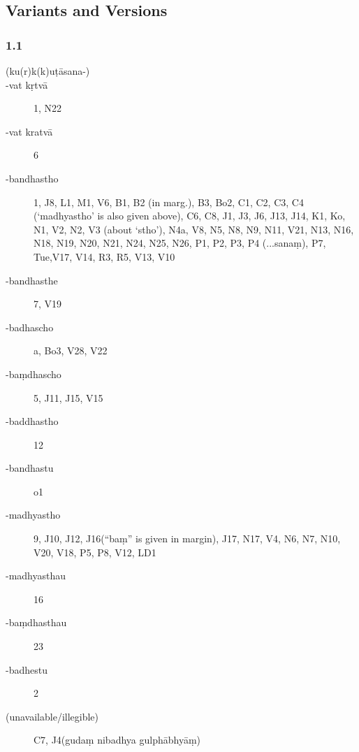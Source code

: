

\newcommand{\myfn}[1]{\footnote{\texteng{#1}}}
\setlength{\footmarkwidth}{1.3em}
\setlength{\footmarksep}{0em}
\setlength{\footparindent}{1.3em}
\usepackage{fnpos}
\makeFNbottom




\pagestyle{HPed} %
\begin{ekdosis}
  
  \chapter{Variants and Versions}

  \subsection*{1.1}
  

  \begin{marma}[hp01_001]
    
    \begin{description}
    \item[(ku(r)k(k)uṭāsana-)]{}
    \item[-vat kṛtvā]{1, N22}
    \item[-vat kratvā]{6}
    \item[-bandhastho]{1, J8, L1, M1, V6, B1, B2 (in marg.), B3, Bo2, C1, C2, C3, C4 (‘madhyastho’ is also given above), C6, C8, J1, J3, J6, J13, J14, K1, Ko, N1, V2, N2, V3 (about ‘stho’), N4a, V8, N5, N8, N9, N11, V21, N13, N16, N18, N19, N20, N21, N24, N25, N26, P1, P2, P3, P4 (...sanaṃ), P7, Tue,V17, V14, R3, R5, V13, V10}
    \item[-bandhasthe]{7, V19}
    \item[-badhascho]{a, Bo3, V28, V22}
    \item[-baṃdhascho]{5, J11, J15, V15}
    \item[-baddhastho]{12}
    \item[-bandhastu]{o1}
    \item[-madhyastho]{9, J10, J12, J16(“baṃ” is given in margin), J17, N17, V4, N6, N7, N10, V20, V18, P5, P8, V12, LD1}
    \item[-madhyasthau]{16}
    \item[-baṃdhasthau]{23}
    \item[-badhestu]{2}
    \item[(unavailable/illegible)]{C7, J4(gudaṃ nibadhya gulphābhyāṃ)}
    \end{description}
    
  \end{marma}


\end{ekdosis}


